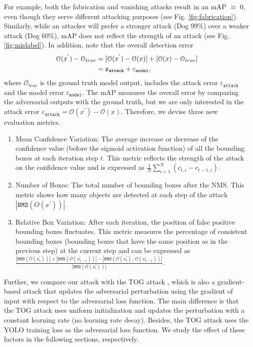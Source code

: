 For example, both the fabrication and vanishing attacks result in an mAP $\approx$ 0, even though they serve different attacking purposes (see Fig. \ref{fig:fabrication}). Similarly, while an attacker will prefer a stronger attack (Dog 99\%) over a weaker attack (Dog 60\%), mAP does not reflect the strength of an attack (see Fig. \ref{fig:mislabel}).
In addition, note that the overall detection error 
\begin{align}
\begin{split}
\mathcal{O}(x^{'}) - \mathcal{O}_{true} & = [\mathcal{O}(x^{'}) - \mathcal{O}(x)] + [\mathcal{O}(x) - \mathcal{O}_{true}] \\
& = \bm{\varepsilon}_{\textbf{\texttt{attack}}} + \varepsilon_{\texttt{model}},
\end{split}
\end{align}
where $\mathcal{O}_{true}$ is the ground truth model output, includes the attack error $\varepsilon_{\texttt{attack}}$ and the model error $\varepsilon_{\texttt{model}}$. The mAP measures the overall error by comparing the adversarial outputs with the ground truth, but we are only interested in the attack error $\varepsilon_{\texttt{attack}}=\mathcal{O}(x^{'}) - \mathcal{O}(x)$.
Therefore, we devise three new evaluation metrics. 
\begin{enumerate}
    \item Mean Confidence Variation: The average increase or decrease of the confidence value (before the sigmoid activation function) of all the bounding boxes at each iteration step $t$. This metric reflects the strength of the attack on the confidence value and is expressed as $\frac{1}{N}\sum_{i=1}^{N}{( c_{t,i} - c_{t-1,i} )}$.
    \item Number of Boxes: The total number of bounding boxes after the NMS. This metric shows how many objects are detected at each step of the attack $|\texttt{NMS}(O(x^{'}))|$.
    \item Relative Box Variation: After each iteration, the position of false positive bounding boxes fluctuates. This metric measures the percentage of consistent bounding boxes (bounding boxes that have the same position as in the previous step) at the current step and can be expressed as $\frac{|\texttt{NMS}(\mathcal{O}(x_t^{'}))| + |\texttt{NMS}(\mathcal{O}(x_{t-1}^{'}))| - |\texttt{NMS}(\mathcal{O}(x_{t}^{'}),\ \mathcal{O}(x_{t-1}^{'}))|}{|\texttt{NMS}(\mathcal{O}(x_t^{'}))|}$.
\end{enumerate}

Further, we compare our attack with the TOG attack \citep{chow2020adversarial}, which is also a gradient-based attack that updates the adversarial perturbation using the gradient of input with respect to the adversarial loss function. The main difference is that the TOG attack uses uniform initialization and updates the perturbation with a constant learning rate (no learning rate decay). Besides, the TOG attack uses the YOLO training loss \citep{redmon2018yolov3, bochkovskiy2020yolov4} as the adversarial loss function. We study the effect of these factors in the following sections, respectively.

